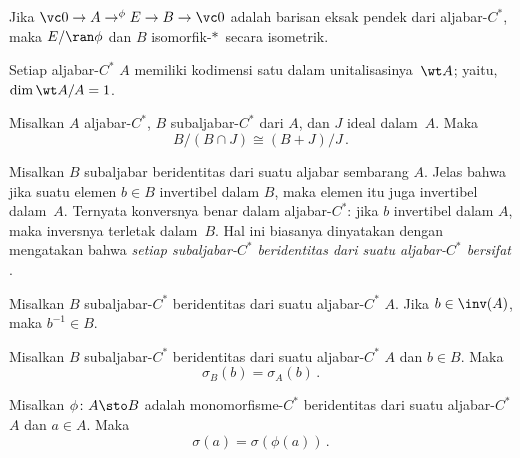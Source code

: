 \begin{cor}\label{001923} Jika $\vc 0 \to A \to^\phi E \to B \to \vc 0$ adalah barisan eksak
pendek dari aljabar-$C^*$, maka $E/\ran\phi$ dan $B$ isomorfik-$*\,$ secara isometrik.
\end{cor}

\begin{cor}\label{001924} Setiap aljabar-$C^*$ $A$ memiliki kodimensi satu dalam
unitalisasinya~$\wt A$; yaitu, $\dim \wt A/A = 1$.
\end{cor}

\begin{prop} Misalkan $A$ aljabar-$C^*$, $B$ subaljabar-$C^*$ dari $A$, dan $J$
ideal dalam~$A$. Maka
   \[  B/(B \cap J) \cong (B + J)/J\,. \]
\end{prop}

Misalkan $B$ subaljabar beridentitas dari suatu aljabar sembarang $A$. Jelas bahwa jika suatu
elemen $b \in B$ invertibel dalam $B$, maka elemen itu juga invertibel dalam~$A$. Ternyata
konversnya benar dalam aljabar-$C^*$: jika $b$ invertibel dalam $A$, maka inversnya
terletak dalam~$B$. Hal ini biasanya dinyatakan dengan mengatakan bahwa \emph{setiap subaljabar-$C^*$
beridentitas dari suatu aljabar-$C^*$ bersifat}
.

\begin{prop} Misalkan $B$ subaljabar-$C^*$ beridentitas dari suatu aljabar-$C^*$ $A$. Jika $b \in \inv(A)$,
maka $b^{-1} \in B$.
\end{prop}

\begin{cor}\label{0019283} Misalkan $B$ subaljabar-$C^*$ beridentitas dari suatu aljabar-$C^*$ $A$ dan
$b \in B$. Maka
   \[ \sigma_B(b) = \sigma_A(b)\,. \]
\end{cor}

\begin{cor}\label{0019286} Misalkan $\phi\colon A \sto B$ adalah monomorfisme-$C^*$ beridentitas dari
suatu aljabar-$C^*$ $A$ dan $a \in A$. Maka
   \[ \sigma(a) = \sigma(\phi(a))\,. \]
\end{cor}



\endinput
